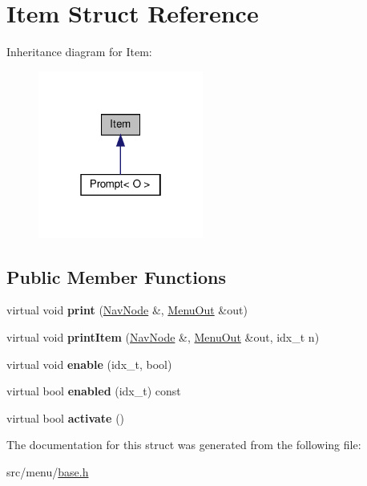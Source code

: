 \hypertarget{structItem}{}\section{Item Struct Reference}
\label{structItem}


Inheritance diagram for Item\+:\nopagebreak
\begin{figure}[H]
\begin{center}
\leavevmode
\includegraphics[width=154pt]{structItem__inherit__graph}
\end{center}
\end{figure}
\subsection*{Public Member Functions}
\begin{DoxyCompactItemize}
\item 
\mbox{\label{structItem_a48e23000fb91838772b9c9bebbd78497}} 
virtual void {\bfseries print} (\hyperlink{structNavNode}{Nav\+Node} \&, \hyperlink{structMenuOut}{Menu\+Out} \&out)
\item 
\mbox{\label{structItem_a6efc4b4278477e89420279d4cfc480b3}} 
virtual void {\bfseries print\+Item} (\hyperlink{structNavNode}{Nav\+Node} \&, \hyperlink{structMenuOut}{Menu\+Out} \&out, idx\+\_\+t n)
\item 
\mbox{\label{structItem_a8f540c337986f0ad492f6916c0ed9983}} 
virtual void {\bfseries enable} (idx\+\_\+t, bool)
\item 
\mbox{\label{structItem_abccd7d2f634cb3c01bdd5941da28d7fc}} 
virtual bool {\bfseries enabled} (idx\+\_\+t) const
\item 
\mbox{\label{structItem_a27f4a62e0a8c76d3238ddd7c0546de10}} 
virtual bool {\bfseries activate} ()
\end{DoxyCompactItemize}


The documentation for this struct was generated from the following file\+:\begin{DoxyCompactItemize}
\item 
src/menu/\hyperlink{base_8h}{base.\+h}\end{DoxyCompactItemize}
